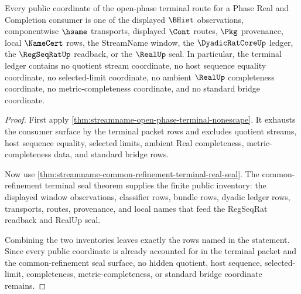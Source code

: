 \begin{theorem}
\label{thm:streamname-open-phase-terminal-ledger-coverage}
Every public coordinate of the open-phase terminal route for a Phase Real and Completion consumer is one of the displayed $\BHist$ observations, componentwise $\hsame$ transports, displayed $\Cont$ routes, $\Pkg$ provenance, local $\NameCert$ rows, the StreamName window, the $\DyadicRatCoreUp$ ledger, the $\RegSeqRatUp$ readback, or the $\RealUp$ seal. In particular, the terminal ledger contains no quotient stream coordinate, no host sequence equality coordinate, no selected-limit coordinate, no ambient $\RealUp$ completeness coordinate, no metric-completeness coordinate, and no standard bridge coordinate.
\end{theorem}
\begin{proof}
First apply \autoref{thm:streamname-open-phase-terminal-nonescape}. It exhausts the consumer surface by the terminal packet rows and excludes quotient streams, host sequence equality, selected limits, ambient Real completeness, metric-completeness data, and standard bridge rows.

Now use \autoref{thm:streamname-common-refinement-terminal-real-seal}. The common-refinement terminal seal theorem supplies the finite public inventory: the displayed window observations, classifier rows, bundle rows, dyadic ledger rows, transports, routes, provenance, and local names that feed the RegSeqRat readback and RealUp seal.

Combining the two inventories leaves exactly the rows named in the statement. Since every public coordinate is already accounted for in the terminal packet and the common-refinement seal surface, no hidden quotient, host sequence, selected-limit, completeness, metric-completeness, or standard bridge coordinate remains.
\end{proof}

